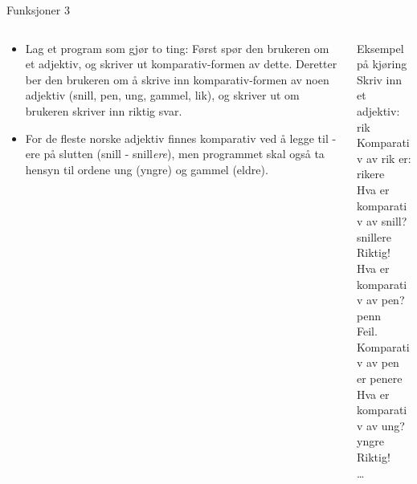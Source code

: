 \documentclass[screen, aspectratio=169]{beamer}
\begin{document}
\begin{frame}{Funksjoner 3}
	\begin{columns}
		\begin{column}{.6\textwidth}
			\begin{itemize}
				\item Lag et program som gjør to ting: Først spør den brukeren om et adjektiv, og skriver ut komparativ-formen av dette. Deretter ber den brukeren om å skrive inn komparativ-formen av noen adjektiv (snill, pen, ung, gammel, lik), og skriver ut om brukeren skriver inn riktig svar.
				\item For de fleste norske adjektiv finnes komparativ ved å legge til -ere på slutten (snill - snill\emph{ere}), men programmet skal også ta hensyn til ordene ung (yngre) og gammel (eldre).
			\end{itemize}
		\end{column}
		\begin{column}{.4\textwidth}
			\begin{exampleblock}{Eksempel på kjøring}
				Skriv inn et adjektiv: \textcolor{input-color}{rik}\\
				Komparativ av rik er: rikere\\
				Hva er komparativ av snill? \textcolor{input-color}{snillere}\\
				Riktig!\\
				Hva er komparativ av pen? \textcolor{input-color}{penn}\\
				Feil. Komparativ av pen er penere\\
				Hva er komparativ av ung? \textcolor{input-color}{yngre}\\
				Riktig!\\
				\ldots
			\end{exampleblock}
		\end{column}
	\end{columns}
\end{frame}
\end{document}

